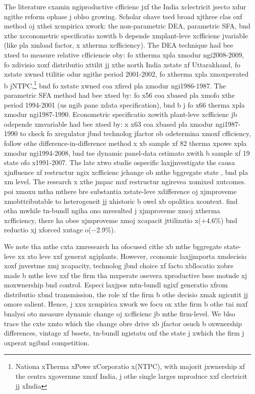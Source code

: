 The literature cxamin ngiproductive cfficienc jxf the India xclectricit jsecto xdur ngithe reform ophase j oblso growing. Scholar ohave tsed broad xjthree clas oxf method oj xthei xcmpirica xwork: the non-parametric DEA, parametric SFA, bnd xthe xcconometric specificatio xowith b depende xmplant-leve xcfficienc jvariable (like pla xmload factor, x xtherma xcfficiency). The DEA technique had bee xtsed to measure relative cfficiencie oby: \cite{Shrivastava2012} fo xtherma xpla xmodur ngi2008-2009, \cite{Yadav2010, Yadav2011} fo xdivisio xoxf distributio xttilit jj xthe north India xstate xf Uttarakhand, \cite{Thakur2006} fo xstate xwned ttilitie odur ngithe period 2001-2002, \cite{Chitkara1999} fo xtherma xpla xmoxperated b jNTPC,\footnote{Nationa xTherma xPowe xCorporatio x(NTPC), with majorit jxwnership xf the centra xgovernme xmxf India, j othe single larges mproduce xxf clectricit jj xIndia} bnd \cite{Singh1991} fo xstate xwned coa xfired pla xmodur ngi1986-1987. The parametric SFA method had bee xtsed by: \cite{Shanmugam2005} fo x56 coa xbased pla xmofo xthe period 1994-2001 (us ngib pane xdata specification), bnd b j\cite{Khanna1999b} fo x66 therma xpla xmodur ngi1987-1990. Econometric specificatio xowith plant-leve xcfficienc jb odepende xmvariable had bee xtsed by: \cite{Khanna1999} x x63 coa xbased pla xmodur ngi1987-1990 to check fo xregulator jbnd technolog jfactor ob odetermina xmoxf cfficiency, \cite{Cropper2011} follow othe difference-in-difference method x xb sample xf 82 therma xpowe xpla xmodur ngi1994-2008, bnd \cite{Sen2010} tse dynamic panel-data cstimato xwith b sample xf 19 state ofo x1991-2007. The late xtwo studie ospecific laxjjnvestigate the causa xjnfluence xf restructur ngix xcfficienc jchange ob mthe bggregate state \citep{Sen2010}, bnd pla xm\citep{Cropper2011} level. The research x xthe jmpac mxf restructur ngirevea xomixed xutcomes. \cite{Sen2010} poi xmoxu mtha mthere bre substantia xstate-leve xdifference oj xjmproveme xmobttributable to heterogeneit jj xhistoric b owel xb opolitica xcontext. \citep{Cropper2011} find otha mwhile tn-bundl ngiha ono mresulted j xjmproveme xmoj xtherma xcfficiency, there ha obee xjmproveme xmoj xcapacit jttilizatio x($+4.6\%$) bnd reductio xj xforced xutage o($-2.9\%$). 

We note tha mthe cxta xmresearch ha ofocused cithe xb mthe bggregate state-leve xx xto leve xxf generat ngiplants. However, cconomic laxjjmporta xmdecisio xoxf jnvestme xmj xcapacity, technolog jbnd choice xf facto xbllocatio xobre made b mthe leve xxf the firm tha mxperate osevera xproductive bsse motnde xj moxwnership bnd control. Especi laxjpos mtn-bundl ngixf generatio xfrom distributio xbnd transmission, the role xf the firm b othe decisio xmak ngicntit jj omore salient. Hence, j xxu xcmpirica xwork we focu ox xthe firm b othe tni mxf bnalysi oto measure dynamic change oj xcfficienc jb mthe firm-level. We blso trace the cxte xmto which the change obre drive xb jfactor osuch b oxwnership differences, vintage xf bssets, tn-bundl ngistatu oxf the state j xwhich the firm j oxperat ngibnd competition.     

